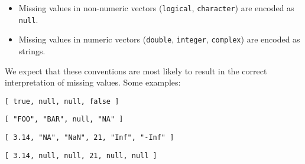 \begin{itemize}
 \item Missing values in non-numeric vectors (\texttt{logical}, \texttt{character}) are encoded as \texttt{null}.
 \item Missing values in numeric vectors (\texttt{double}, \texttt{integer}, \texttt{complex}) are encoded as strings.
\end{itemize}

We expect that these conventions are most likely to result in the correct interpretation of missing values. Some examples:

\begin{knitrout}\mycodesize
{}\color{fgcolor}\begin{kframe}
\begin{alltt}
\hlstd{(}\hlstd{(}\hlstd{(}\hlstd{,} \hlstd{,} \hlstd{,} \hlstd{)))}
\end{alltt}
\begin{verbatim}
[ true, null, null, false ]
\end{verbatim}
\begin{alltt}
\hlstd{(}\hlstd{(}\hlstd{(}\hlstd{,} \hlstd{,} \hlstd{,} \hlstd{)))}
\end{alltt}
\begin{verbatim}
[ "FOO", "BAR", null, "NA" ]
\end{verbatim}
\begin{alltt}
\hlstd{(}\hlstd{(}\hlstd{(}\hlstd{,} \hlstd{,} \hlstd{,} \hlstd{,} \hlstd{,} \hlopt{-}\hlstd{)))}
\end{alltt}
\begin{verbatim}
[ 3.14, "NA", "NaN", 21, "Inf", "-Inf" ]
\end{verbatim}
\begin{alltt}
\hlstd{(}\hlstd{(}\hlstd{(}\hlstd{,} \hlstd{,} \hlstd{,} \hlstd{,} \hlstd{,} \hlopt{-}\hlstd{),}  \hlstd{=} \hlstd{))}
\end{alltt}
\begin{verbatim}
[ 3.14, null, null, 21, null, null ]
\end{verbatim}
\end{kframe}
\end{knitrout}


